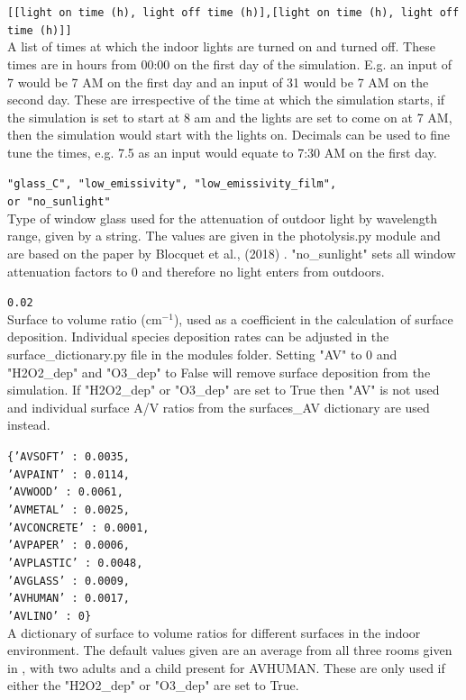 \documentclass[a4paper]{refart}
\begin{document}
\texttt{[[light on time (h), light off time (h)],[light on time (h), light off time (h)]]}\\
A list of times at which the indoor lights are turned on and turned off. These times are in hours from 00:00 on the first day of the simulation. E.g. an input of 7 would be 7 AM on the first day and an input of 31 would be 7 AM on the second day. These are irrespective of the time at which the simulation starts, if the simulation is set to start at 8 am and the lights are set to come on at 7 AM, then the simulation would start with the lights on. Decimals can be used to fine tune the times, e.g. 7.5 as an input would equate to 7:30 AM on the first day.

\texttt{"glass\_C", "low\_emissivity", "low\_emissivity\_film", \\or "no\_sunlight"}\\
Type of window glass used for the attenuation of outdoor light by wavelength range, given by a string. The values are given in the photolysis.py module  and are based on the paper by Blocquet et al., (2018) \cite{Blocquet2018}. "no\_sunlight" sets all window attenuation factors to 0 and therefore no light enters from outdoors.

\texttt{0.02}\\
Surface to volume ratio (cm$^{-1}$), used as a coefficient in the calculation of surface deposition. Individual species deposition rates can be adjusted in the surface\_dictionary.py  file in the modules folder. Setting "AV" to 0 and "H2O2\_dep" and "O3\_dep" to False will remove surface deposition from the simulation. If "H2O2\_dep" or "O3\_dep" are set to True then "AV" is not used and individual surface A/V ratios from the surfaces\_AV dictionary are used instead.

\texttt{\{'AVSOFT' : 0.0035,\\
    'AVPAINT' : 0.0114,\\
    'AVWOOD' : 0.0061,\\
    'AVMETAL' : 0.0025,\\
    'AVCONCRETE' : 0.0001,\\
    'AVPAPER' : 0.0006,\\
    'AVPLASTIC' : 0.0048,\\
    'AVGLASS' : 0.0009,\\
    'AVHUMAN' : 0.0017,\\
    'AVLINO' : 0\}\\}
A dictionary of surface to volume ratios for different surfaces in the indoor environment. The default values given are an average from all three rooms given in \cite{Carter2023}, with two adults and a child present for AVHUMAN. These are only used if either the "H2O2\_dep" or "O3\_dep" are set to True.
\end{document}
